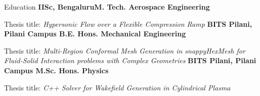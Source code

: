 \begin{rubric}{Education}
\entry*[2019 -- 2021]%
	\textbf{IISc, Bengaluru\newline M. Tech. Aerospace Engineering}
	\par Thesis title: \emph{Hypersonic Flow over a Flexible Compression Ramp}
%
\entry*[2014 -- 2019]%
	\textbf{BITS Pilani, Pilani Campus \newline B.E. Hons. Mechanical Engineering}\par
	Thesis title: \emph{Multi-Region Conformal Mesh Generation in snappyHexMesh for Fluid-Solid Interaction problems with Complex Geometries}
% 
\entry*[2014 -- 2019]%
	\textbf{BITS Pilani, Pilani Campus \newline M.Sc. Hons. Physics}\par
	Thesis title: \emph{C++ Solver for Wakefield Generation in Cylindrical Plasma}
\end{rubric}